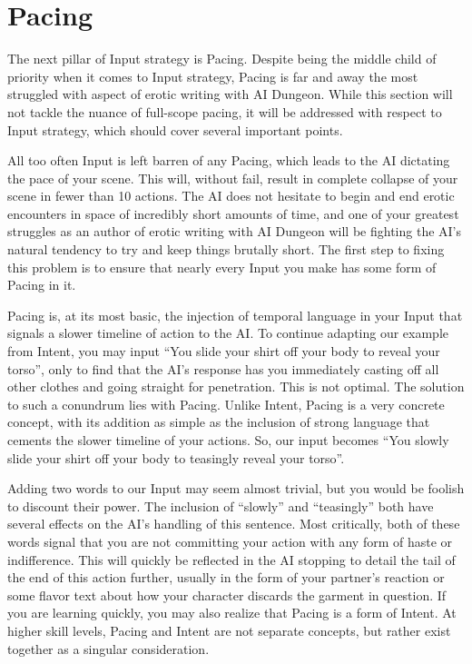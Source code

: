 \documentclass[Source-main.tex]{subfiles}
\begin{document}
\section{Pacing}

The next pillar of Input strategy is Pacing.
Despite being the middle child of priority when it comes to Input strategy, Pacing is far and away the most struggled with aspect of erotic writing with AI Dungeon.
While this section will not tackle the nuance of full-scope pacing, it will be addressed with respect to Input strategy, which should cover several important points.

All too often Input is left barren of any Pacing, which leads to the AI dictating the pace of your scene.
This will, without fail, result in complete collapse of your scene in fewer than 10 actions.
The AI does not hesitate to begin and end erotic encounters in space of incredibly short amounts of time, and one of your greatest struggles as an author of erotic writing with AI Dungeon will be fighting the AI’s natural tendency to try and keep things brutally short.
The first step to fixing this problem is to ensure that nearly every Input you make has some form of Pacing in it.

Pacing is, at its most basic, the injection of temporal language in your Input that signals a slower timeline of action to the AI.
To continue adapting our example from Intent, you may input “You slide your shirt off your body to reveal your torso”, only to find that the AI’s response has you immediately casting off all other clothes and going straight for penetration.
This is not optimal.
The solution to such a conundrum lies with Pacing.
Unlike Intent, Pacing is a very concrete concept, with its addition as simple as the inclusion of strong language that cements the slower timeline of your actions.
So, our input becomes “You slowly slide your shirt off your body to teasingly reveal your torso”.

Adding two words to our Input may seem almost trivial, but you would be foolish to discount their power.
The inclusion of “slowly” and “teasingly” both have several effects on the AI’s handling of this sentence.
Most critically, both of these words signal that you are not committing your action with any form of haste or indifference.
This will quickly be reflected in the AI stopping to detail the tail of the end of this action further, usually in the form of your partner’s reaction or some flavor text about how your character discards the garment in question.
If you are learning quickly, you may also realize that Pacing is a form of Intent.
At higher skill levels, Pacing and Intent are not separate concepts, but rather exist together as a singular consideration.
\end{document}
